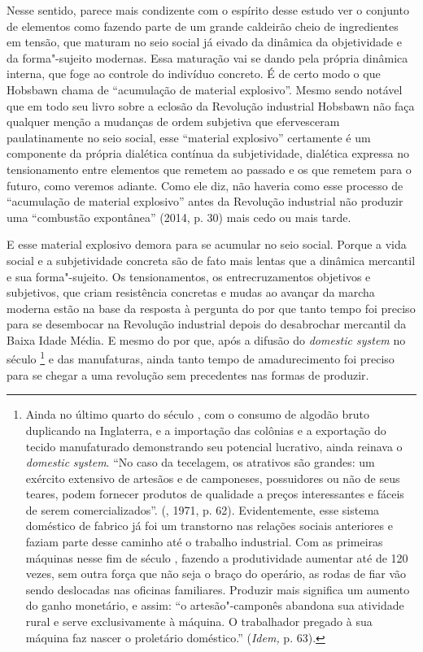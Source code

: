 Nesse sentido, parece mais condizente com o espírito desse estudo ver o
conjunto de elementos como fazendo parte de um grande caldeirão cheio de
ingredientes em tensão, que maturam no seio social já eivado da dinâmica
da objetividade e da forma"-sujeito modernas. Essa maturação vai se dando
pela própria dinâmica interna, que foge ao controle do indivíduo
concreto. É de certo modo o que Hobsbawn chama de ``acumulação de
material explosivo''. Mesmo sendo notável que em todo seu livro sobre a
eclosão da Revolução industrial Hobsbawn não faça qualquer menção a
mudanças de ordem subjetiva que efervesceram paulatinamente no seio
social, esse ``material explosivo'' certamente é um componente da
própria dialética contínua da subjetividade, dialética expressa no
tensionamento entre elementos que remetem ao passado e os que remetem
para o futuro, como veremos adiante. Como ele diz, não haveria como esse
processo de ``acumulação de material explosivo'' antes da Revolução
industrial não produzir uma ``combustão expontânea'' (2014, p. 30) mais
cedo ou mais tarde.

E esse material explosivo demora para se acumular no seio social. Porque
a vida social e a subjetividade concreta são de fato mais lentas que a
dinâmica mercantil e sua forma"-sujeito. Os tensionamentos, os
entrecruzamentos objetivos e subjetivos, que criam resistência concretas
e mudas ao avançar da marcha moderna estão na base da resposta à
pergunta do por que tanto tempo foi preciso para se desembocar na
Revolução industrial depois do desabrochar mercantil da Baixa Idade
Média. E mesmo do por que, após a difusão do \emph{domestic system} no
século \footnote{Ainda no último quarto do século , com o
  consumo de algodão bruto duplicando na Inglaterra, e a importação das
  colônias e a exportação do tecido manufaturado demonstrando seu
  potencial lucrativo, ainda reinava o \emph{domestic} \emph{system}.
  ``No caso da tecelagem, os atrativos são grandes: um exército
  extensivo de artesãos e de camponeses, possuidores ou não de seus
  teares, podem fornecer produtos de qualidade a preços interessantes e
  fáceis de serem comercializados''. (, 1971, p. 62).
  Evidentemente, esse sistema doméstico de fabrico já foi um transtorno
  nas relações sociais anteriores e faziam parte desse caminho até o
  trabalho industrial. Com as primeiras máquinas nesse fim de século
  , fazendo a produtividade aumentar até de 120 vezes, sem outra
  força que não seja o braço do operário, as rodas de fiar vão sendo
  deslocadas nas oficinas familiares. Produzir mais significa um aumento
  do ganho monetário, e assim: ``o artesão"-camponês abandona sua
  atividade rural e serve exclusivamente à máquina. O trabalhador
  pregado à sua máquina faz nascer o proletário doméstico.''
  (\emph{Idem,} p. 63).} e das manufaturas, ainda tanto tempo de
amadurecimento foi preciso para se chegar a uma revolução sem
precedentes nas formas de produzir.

